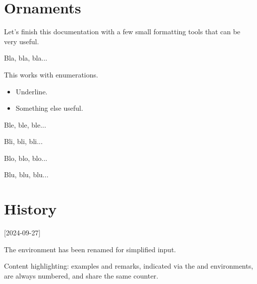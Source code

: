 

\begin{tdocexa}
    \leavevmode


\end{tdocexa}




\begin{tdocexa}
    \leavevmode


\end{tdocexa}


\section{Ornaments}

Let's finish this documentation with a few small formatting tools that can be very useful.


\begin{tdoclatex}
Bla, bla, bla...

\tdocsep %

This works with enumerations.

\begin{itemize}
    \item Underline.
    \item Something else useful.
\end{itemize}

\tdocsep %

Ble, ble, ble...

Bli, bli, bli...

\tdocxspace %

Blo, blo, blo...

Blu, blu, blu...

\end{tdoclatex}


\section{History}

\small

[2024-09-27]

\begin{tdocbreak}
	\item The  environment has been renamed  for simplified input.
	
	\item Content highlighting: examples and remarks, indicated via the  and  environments, are always numbered, and share the same counter.
\end{tdocbreak}


